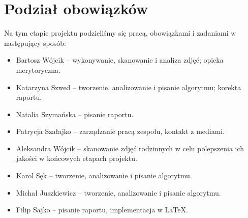 \documentclass[]{mwart}
\begin{document}
\section{Podział obowiązków}
Na tym etapie projektu podzieliśmy się pracą, obowiązkami i zadaniami w następujący sposób:
\begin{itemize}
    \item Bartosz Wójcik -- wykonywanie, skanowanie i analiza zdjęć; opieka merytoryczna.
    \item Katarzyna Szwed -- tworzenie, analizowanie i pisanie algorytmu; korekta raportu.
    \item Natalia Szymańska -- pisanie raportu.
    \item Patrycja Szałajko -- zarządzanie pracą zespołu, kontakt z mediami.
    \item Aleksandra Wójcik -- skanowanie zdjęć rodzinnych w celu polepszenia ich jakości w końcowych etapach projektu.
    \item Karol Sęk -- tworzenie, analizowanie i pisanie algorytmu.
    \item Michał Juszkiewicz -- tworzenie, analizowanie i pisanie algorytmu.
    \item Filip Sajko -- pisanie raportu, implementacja w \LaTeX{}.
\end{itemize}
\end{document}
